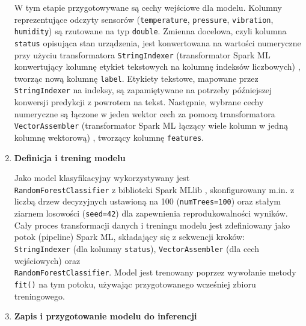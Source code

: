 \begin{enumerate}
W tym etapie przygotowywane są cechy wejściowe dla modelu. Kolumny reprezentujące odczyty sensorów (\texttt{temperature}, \texttt{pressure}, \texttt{vibration}, \texttt{humidity}) są rzutowane na typ \texttt{double}. Zmienna docelowa, czyli kolumna \texttt{status} opisująca stan urządzenia, jest konwertowana na wartości numeryczne przy użyciu transformatora \texttt{StringIndexer} (transformator Spark ML konwertujący kolumnę etykiet tekstowych na kolumnę indeksów liczbowych) \cite{spark_string_indexer}, tworząc nową kolumnę \texttt{label}. Etykiety tekstowe, mapowane przez \texttt{StringIndexer} na indeksy, są zapamiętywane na potrzeby późniejszej konwersji predykcji z powrotem na tekst. Następnie, wybrane cechy numeryczne są łączone w jeden wektor cech za pomocą transformatora \texttt{VectorAssembler} (transformator Spark ML łączący wiele kolumn w jedną kolumnę wektorową) \cite{spark_vector_assember} , tworzący kolumnę \texttt{features}.

    \item \textbf{Definicja i trening modelu}

Jako model klasyfikacyjny wykorzystywany jest \\ \texttt{RandomForestClassifier} z biblioteki Spark MLlib \cite{spark_mllib_reference}, skonfigurowany m.in. z liczbą drzew decyzyjnych ustawioną na 100 (\texttt{numTrees=100}) oraz stałym ziarnem losowości (\texttt{seed=42}) dla zapewnienia reprodukowalności wyników. Cały proces transformacji danych i treningu modelu jest zdefiniowany jako potok (pipeline) Spark ML, składający się z sekwencji kroków: \texttt{StringIndexer} (dla kolumny \texttt{status}), \texttt{VectorAssembler} (dla cech wejściowych) oraz \\ \texttt{RandomForestClassifier}. Model jest trenowany poprzez wywołanie metody \texttt{fit()} na tym potoku, używając przygotowanego wcześniej zbioru treningowego.

    \item \textbf{Zapis i przygotowanie modelu do inferencji}


\end{enumerate}
